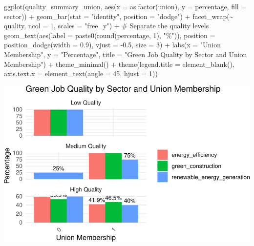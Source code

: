 \documentclass[
  letterpaper,
  DIV=11,
  numbers=noendperiod]{scrartcl}
\newenvironment{Shaded}{\begin{snugshade}}{\end{snugshade}}
\newcommand{\AttributeTok}[1]{\textcolor[rgb]{0.40,0.45,0.13}{#1}}
\newcommand{\CommentTok}[1]{\textcolor[rgb]{0.37,0.37,0.37}{#1}}
\newcommand{\DecValTok}[1]{\textcolor[rgb]{0.68,0.00,0.00}{#1}}
\newcommand{\FloatTok}[1]{\textcolor[rgb]{0.68,0.00,0.00}{#1}}
\newcommand{\FunctionTok}[1]{\textcolor[rgb]{0.28,0.35,0.67}{#1}}
\newcommand{\NormalTok}[1]{\textcolor[rgb]{0.00,0.23,0.31}{#1}}
\newcommand{\SpecialCharTok}[1]{\textcolor[rgb]{0.37,0.37,0.37}{#1}}
\newcommand{\StringTok}[1]{\textcolor[rgb]{0.13,0.47,0.30}{#1}}
\begin{document}
\begin{Shaded}
\begin{Highlighting}[]
\FunctionTok{ggplot}\NormalTok{(quality\_summary\_union, }\FunctionTok{aes}\NormalTok{(}\AttributeTok{x =} \FunctionTok{as.factor}\NormalTok{(union), }\AttributeTok{y =}\NormalTok{ percentage, }\AttributeTok{fill =}\NormalTok{ sector)) }\SpecialCharTok{+}
  \FunctionTok{geom\_bar}\NormalTok{(}\AttributeTok{stat =} \StringTok{"identity"}\NormalTok{, }\AttributeTok{position =} \StringTok{"dodge"}\NormalTok{) }\SpecialCharTok{+}
  \FunctionTok{facet\_wrap}\NormalTok{(}\SpecialCharTok{\textasciitilde{}}\NormalTok{ quality, }\AttributeTok{ncol =} \DecValTok{1}\NormalTok{, }\AttributeTok{scales =} \StringTok{"free\_y"}\NormalTok{) }\SpecialCharTok{+} \CommentTok{\# Separate the quality levels}
  \FunctionTok{geom\_text}\NormalTok{(}\FunctionTok{aes}\NormalTok{(}\AttributeTok{label =} \FunctionTok{paste0}\NormalTok{(}\FunctionTok{round}\NormalTok{(percentage, }\DecValTok{1}\NormalTok{), }\StringTok{"\%"}\NormalTok{)), }
            \AttributeTok{position =} \FunctionTok{position\_dodge}\NormalTok{(}\AttributeTok{width =} \FloatTok{0.9}\NormalTok{), }\AttributeTok{vjust =} \SpecialCharTok{{-}}\FloatTok{0.5}\NormalTok{, }\AttributeTok{size =} \DecValTok{3}\NormalTok{) }\SpecialCharTok{+}
  \FunctionTok{labs}\NormalTok{(}\AttributeTok{x =} \StringTok{"Union Membership"}\NormalTok{, }\AttributeTok{y =} \StringTok{"Percentage"}\NormalTok{, }\AttributeTok{title =} \StringTok{"Green Job Quality by Sector and Union Membership"}\NormalTok{) }\SpecialCharTok{+}
  \FunctionTok{theme\_minimal}\NormalTok{() }\SpecialCharTok{+}
  \FunctionTok{theme}\NormalTok{(}\AttributeTok{legend.title =} \FunctionTok{element\_blank}\NormalTok{(), }\AttributeTok{axis.text.x =} \FunctionTok{element\_text}\NormalTok{(}\AttributeTok{angle =} \DecValTok{45}\NormalTok{, }\AttributeTok{hjust =} \DecValTok{1}\NormalTok{))}
\end{Highlighting}
\end{Shaded}

\includegraphics{index_files/figure-pdf/unnamed-chunk-31-1.pdf}
\end{document}
